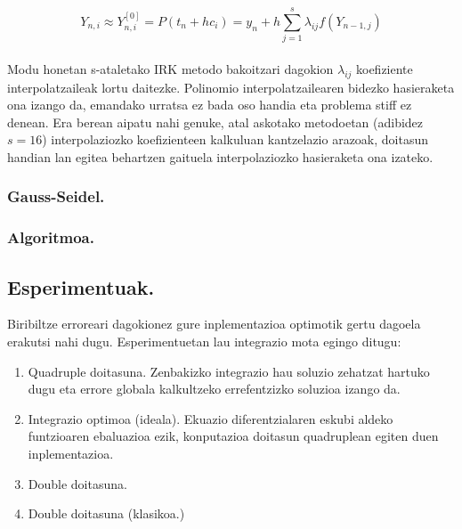 \begin{equation}
Y_{n,i} \approx Y_{n,i}^{[0]}= P(t_n+hc_i) = y_n+ h \sum\limits_{j=1}^{s} \lambda_{ij}f(Y_{n-1,j})
\end{equation}

\paragraph*{} Modu honetan s-ataletako IRK metodo bakoitzari dagokion $\lambda_{ij}$ koefiziente interpolatzaileak lortu daitezke. Polinomio interpolatzailearen bidezko hasieraketa ona izango da, emandako urratsa ez bada oso handia eta problema stiff ez denean. Era berean aipatu nahi genuke, atal askotako metodoetan (adibidez $s=16$)  interpolaziozko koefizienteen kalkuluan kantzelazio arazoak,  doitasun handian lan egitea behartzen gaituela interpolaziozko hasieraketa ona izateko.  

\subsubsection{Gauss-Seidel.}

\subsubsection{Algoritmoa.}

\subsection{Esperimentuak.}

Biribiltze erroreari dagokionez gure inplementazioa optimotik gertu dagoela erakutsi nahi dugu. Esperimentuetan lau integrazio mota egingo ditugu:

\begin{enumerate}

\item Quadruple doitasuna. Zenbakizko integrazio hau soluzio zehatzat hartuko dugu eta errore globala kalkultzeko errefentzizko soluzioa izango da.

\item Integrazio optimoa (ideala). Ekuazio diferentzialaren eskubi aldeko funtzioaren ebaluazioa ezik, konputazioa doitasun quadruplean  egiten duen inplementazioa. 

\item Double doitasuna.

\item Double doitasuna (klasikoa.)

\end{enumerate}

